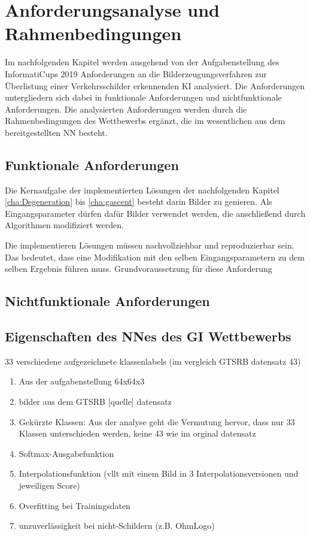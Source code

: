 \chapter{Anforderungsanalyse und Rahmenbedingungen}
\label{cha:AnfAnalyse}

Im nachfolgenden Kapitel werden ausgehend von der Aufgabenstellung des InformatiCups 2019 Anforderungen an die Bilderzeugungsverfahren zur Überlistung einer Verkehrsschilder erkennenden \ac{KI} analysiert. Die Anforderungen untergliedern sich dabei in funktionale Anforderungen und nichtfunktionale Anforderungen. Die analysierten Anforderungen werden durch die Rahmenbedingungen des Wettbewerbs ergänzt, die im wesentlichen aus dem bereitgestellten \acl{NN} besteht.

\section{Funktionale Anforderungen}
Die Kernaufgabe der implementierten Lösungen der nachfolgenden Kapitel \ref{cha:Degeneration} bis \ref{cha:gascent} besteht darin Bilder zu genieren. Als Eingangsparameter dürfen dafür Bilder verwendet werden, die anschließend durch Algorithmen modifiziert werden.

Die implementieren Lösungen müssen nachvollziehbar und reproduzierbar sein. Das bedeutet, dass eine Modifikation mit den selben Eingangsparametern zu dem selben Ergebnis führen muss. Grundvoraussetzung für diese Anforderung 

\section{Nichtfunktionale Anforderungen}



\section{Eigenschaften des \acl{NN}es des GI Wettbewerbs}
\label{sec:EigenschaftenTrasi}




33 verschiedene aufgezeichnete klassenlabels (im vergleich GTSRB datensatz 43)

\begin{enumerate}
	\item 
	Aus der aufgabenstellung 64x64x3
	\item 
	bilder aus dem GTSRB [quelle] datensatz
	\item Gekürzte Klassen: Aus der analyse geht die Vermutung hervor, dass nur 33 Klassen unterschieden werden, keine 43 wie im orginal datensatz
	\item Softmax-Ausgabefunktion 
	\item Interpolationsfunktion (vllt mit einem Bild in 3 Interpolationsversionen und jeweiligen Score) 
	\item Overfitting bei Trainingsdaten
	\item unzuverlässigkeit bei nicht-Schildern (z.B. OhmLogo)
\end{enumerate}



